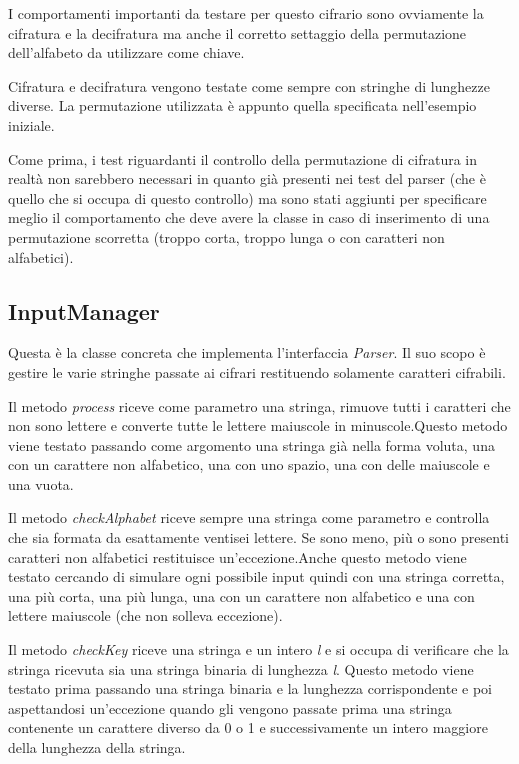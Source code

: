 			I comportamenti importanti da testare per questo cifrario sono ovviamente la cifratura e la decifratura ma anche il corretto settaggio della permutazione dell'alfabeto da utilizzare come chiave.
			
			Cifratura e decifratura vengono testate come sempre con stringhe di lunghezze diverse. La permutazione utilizzata è appunto quella specificata nell'esempio iniziale.
			
			Come prima, i test riguardanti il controllo della permutazione di cifratura in realtà non sarebbero necessari in quanto già presenti nei test del parser (che è quello che si occupa di questo controllo) ma sono stati aggiunti per specificare meglio il comportamento che deve avere la classe in caso di inserimento di una permutazione scorretta (troppo corta, troppo lunga o con caratteri non alfabetici).
			
		\subsection{InputManager}
			Questa è la classe concreta che implementa l'interfaccia \emph{Parser}. Il suo scopo è gestire le varie stringhe passate ai cifrari restituendo solamente caratteri cifrabili.
			
			Il metodo \emph{process} riceve come parametro una stringa, rimuove tutti i caratteri che non sono lettere e converte tutte le lettere maiuscole in minuscole.Questo metodo viene testato passando come argomento una stringa già nella forma voluta, una con un carattere non alfabetico, una con uno spazio, una con delle maiuscole e una vuota.
			
			Il metodo \emph{checkAlphabet} riceve sempre una stringa come parametro e controlla che sia formata da esattamente ventisei lettere. Se sono meno, più o sono presenti caratteri non alfabetici restituisce un'eccezione.Anche questo metodo viene testato cercando di simulare ogni possibile input quindi con una stringa corretta, una più corta, una più lunga, una con un carattere non alfabetico e una con lettere maiuscole (che non solleva eccezione).
			
			Il metodo \emph{checkKey} riceve una stringa e un intero \emph{l} e si occupa di verificare che la stringa ricevuta sia una stringa binaria di lunghezza \emph{l}. Questo metodo viene testato prima passando una stringa binaria e la lunghezza corrispondente e poi aspettandosi un'eccezione quando gli vengono passate prima una stringa contenente un carattere diverso da 0 o 1 e successivamente un intero maggiore della lunghezza della stringa.
			
